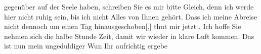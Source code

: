                gegenüber auf der Seele haben, schreiben Sie es mir bitte Gleich, denn ich werde hier
               nicht ruhig sein, bis ich nicht Alles von Ihnen gehört. Dass ich meine Abreise nicht
               dennoch um einen Tag hinausgeschoben{[},{]} thut mir jetzt . Ich hoffe Sie nehmen sich die halbe Stunde
               Zeit, damit wir wieder in klare Luft kommen. Das ist nun mein ungeduldiger Wun\pend
           \pstart Ihr aufrichtig ergebe\pend{}\endnumbering{}  
      